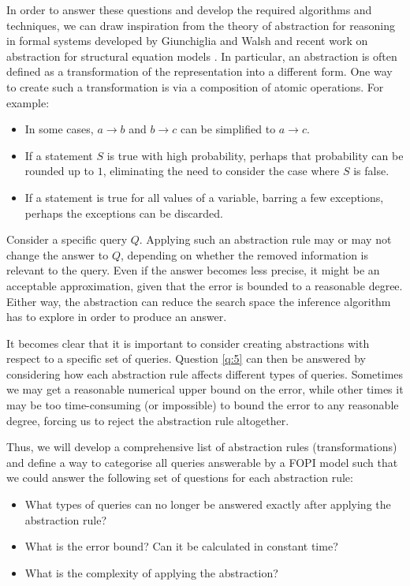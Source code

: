 \documentclass{article}
\begin{document}
In order to answer these questions and develop the required algorithms and
techniques, we can draw inspiration from the theory of abstraction for reasoning
in formal systems developed by Giunchiglia and Walsh
\cite{DBLP:journals/ai/GiunchigliaW92} and recent work on abstraction for
structural equation models \cite{DBLP:conf/uai/RubensteinWBMJG17}. In
particular, an abstraction is often defined as a transformation of the
representation into a different form. One way to create such a transformation is
via a composition of atomic operations. For example:
\begin{itemize}
\item In some cases, $a \rightarrow b$ and $b \rightarrow c$ can be simplified
  to $a \rightarrow c$.
\item If a statement $S$ is true with high probability, perhaps that probability
  can be rounded up to $1$, eliminating the need to consider the case where $S$
  is false.
\item If a statement is true for all values of a variable, barring a few
  exceptions, perhaps the exceptions can be discarded.
\end{itemize}

Consider a specific query $Q$. Applying such an abstraction rule may or may not
change the answer to $Q$, depending on whether the removed information
is relevant to the query. Even if the answer becomes less precise, it might be
an acceptable approximation, given that the error is bounded to a reasonable
degree. Either way, the abstraction can reduce the search space the inference
algorithm has to explore in order to produce an answer.

It becomes clear that it is important to consider creating abstractions with
respect to a specific set of queries. Question \ref{q:5} can then be answered by
considering how each abstraction rule affects different types of queries.
Sometimes we may get a reasonable numerical upper bound on the error, while
other times it may be too time-consuming (or impossible) to bound the error to
any reasonable degree, forcing us to reject the abstraction rule altogether.

Thus, we will develop a comprehensive list of abstraction rules
(transformations) and define a way to categorise all queries answerable by a
FOPI model such that we could answer the following set of questions for each
abstraction rule:
\begin{itemize}
\item What types of queries can no longer be answered exactly after applying the
  abstraction rule?
\item What is the error bound? Can it be calculated in constant time?
\item What is the complexity of applying the abstraction?
\end{itemize}
\end{document}
